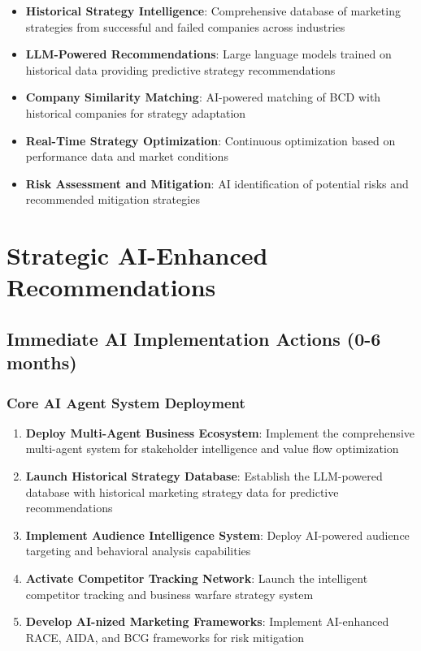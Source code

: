 \begin{itemize}
    \item \textbf{Historical Strategy Intelligence}: Comprehensive database of marketing strategies from successful and failed companies across industries
    \item \textbf{LLM-Powered Recommendations}: Large language models trained on historical data providing predictive strategy recommendations
    \item \textbf{Company Similarity Matching}: AI-powered matching of BCD with historical companies for strategy adaptation
    \item \textbf{Real-Time Strategy Optimization}: Continuous optimization based on performance data and market conditions
    \item \textbf{Risk Assessment and Mitigation}: AI identification of potential risks and recommended mitigation strategies
\end{itemize}

\section{Strategic AI-Enhanced Recommendations}

\subsection{Immediate AI Implementation Actions (0-6 months)}

\subsubsection{Core AI Agent System Deployment}

\begin{enumerate}
    \item \textbf{Deploy Multi-Agent Business Ecosystem}: Implement the comprehensive multi-agent system for stakeholder intelligence and value flow optimization
    \item \textbf{Launch Historical Strategy Database}: Establish the LLM-powered database with historical marketing strategy data for predictive recommendations
    \item \textbf{Implement Audience Intelligence System}: Deploy AI-powered audience targeting and behavioral analysis capabilities
    \item \textbf{Activate Competitor Tracking Network}: Launch the intelligent competitor tracking and business warfare strategy system
    \item \textbf{Develop AI-nized Marketing Frameworks}: Implement AI-enhanced RACE, AIDA, and BCG frameworks for risk mitigation
\end{enumerate}

